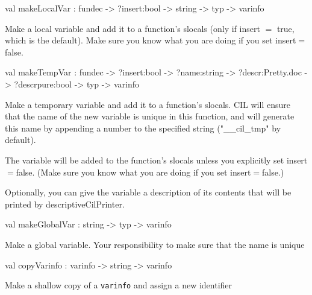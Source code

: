 \documentclass[11pt]{article}
\begin{document}
\label{val:Cil.makeLocalVar}\begin{ocamldoccode}
val makeLocalVar : fundec -> ?insert:bool -> string -> typ -> varinfo
\end{ocamldoccode}
\begin{ocamldocdescription}
Make a local variable and add it to a function's slocals (only if insert $=$ 
    true, which is the default). Make sure you know what you are doing if you 
    set insert$=$false.


\end{ocamldocdescription}




\label{val:Cil.makeTempVar}\begin{ocamldoccode}
val makeTempVar :
  fundec ->
  ?insert:bool ->
  ?name:string ->
  ?descr:Pretty.doc -> ?descrpure:bool -> typ -> varinfo
\end{ocamldoccode}
\begin{ocamldocdescription}
Make a temporary variable and add it to a function's slocals. CIL will
    ensure that the name of the new variable is unique in this function, and
    will generate this name by appending a number to the specified string
    ("\_\_cil\_tmp" by default).


    The variable will be added to the function's slocals unless you explicitly
    set insert$=$false.  (Make sure you know what you are doing if you set
    insert$=$false.)


    Optionally, you can give the variable a description of its contents
    that will be printed by descriptiveCilPrinter.


\end{ocamldocdescription}




\label{val:Cil.makeGlobalVar}\begin{ocamldoccode}
val makeGlobalVar : string -> typ -> varinfo
\end{ocamldoccode}
\begin{ocamldocdescription}
Make a global variable. Your responsibility to make sure that the name 
    is unique


\end{ocamldocdescription}




\label{val:Cil.copyVarinfo}\begin{ocamldoccode}
val copyVarinfo : varinfo -> string -> varinfo
\end{ocamldoccode}
\begin{ocamldocdescription}
Make a shallow copy of a {\tt{varinfo}} and assign a new identifier


\end{ocamldocdescription}
\end{document}
